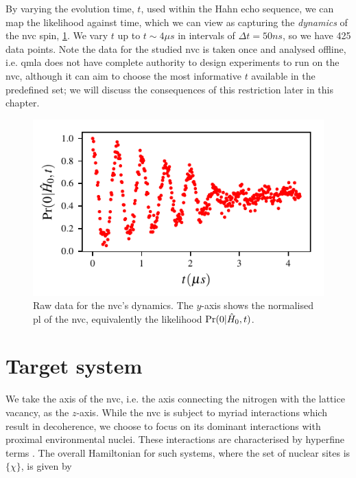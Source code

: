 \par 

By varying the evolution time, $t$, used within the Hahn echo sequence, we can map the \gls{likelihood} against time, 
    which we can view as capturing the \emph{dynamics} of the \gls{nvc} spin, \cref{fig:nv_raw_data}.
We vary $t$ up to $t \sim 4 \mu s$ in intervals of $\Delta t = 50 ns$, 
    so we have 425 data points. 
Note the data for the studied \gls{nvc} is taken once and analysed offline, 
    i.e. \gls{qmla} does not have complete authority to design experiments 
    to run on the \gls{nvc}, although it can aim to choose the most informative $t$ 
    available in the predefined set; we will discuss the consequences of this restriction 
    later in this chapter. 

\begin{figure}[t]
    \begin{center}
        \includegraphics{experimental_study/figures/raw_data.pdf}
    \end{center}
    \caption[Raw data for nitrogen-vacancy centre's dynamics]{
        Raw data for the \acrlong{nvc}'s dynamics.
        The $y$-axis shows the normalised \acrlong{pl} of the \gls{nvc}, 
        equivalently the \gls{likelihood} $\Pr(0 | \hat{H}_0, t)$. 
    }
    \label{fig:nv_raw_data}
\end{figure}



\section{Target system}\label{sec:target_system}
We take the axis of the \gls{nvc}, i.e. the axis connecting the \gls{nitrogen} with the 
    lattice vacancy, as the $z$-axis.
While the \gls{nvc} is subject to myriad interactions which result in decoherence,
    we choose to focus on its dominant interactions with proximal environmental nuclei. 
These interactions are characterised by hyperfine terms \cite{smeltzer201113c}.
The overall Hamiltonian for such systems, where the set of nuclear sites is $\{\chi\}$,
    is given by 

